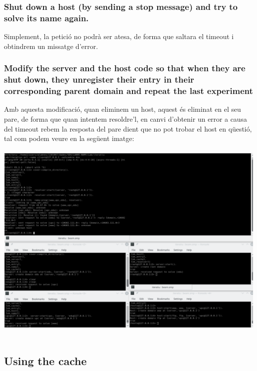 \documentclass[a4paper, 10pt]{article}
\begin{document}
\subsubsection{Shut down a host (by sending a stop message) and try to solve its name again.}
Simplement, la petició no podrà ser atesa, de forma que saltara el timeout i obtindrem un missatge d'error.
\newpage\subsubsection{Modify the server and the host code so that when they are shut down, they unregister their entry in their corresponding parent domain and repeat the last experiment}
Amb aquesta modificació, quan eliminem un host, aquest és eliminat en el seu pare, de forma que quan intentem resoldre'l, en canvi d'obtenir un error a causa del timeout rebem la resposta del pare dient que no pot trobar el host en qüestió, tal com podem veure en la següent imatge:\\\\
\includegraphics[width=\textwidth]{Ex2.png}\\\\
\subsection{Using the cache}
\end{document}
